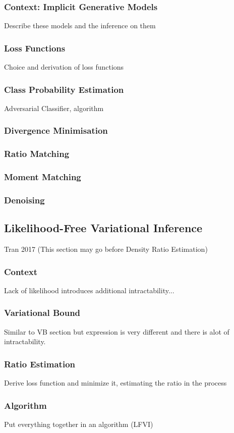 \documentclass[a4paper,12pt]{article}
\begin{document}
\subsubsection{Context: Implicit Generative Models}
Describe these models and the inference on them
\subsubsection{Loss Functions}
Choice and derivation of loss functions
\subsubsection{Class Probability Estimation}
Adversarial Classifier, algorithm
\subsubsection{Divergence Minimisation}

\subsubsection{Ratio Matching}

\subsubsection{Moment Matching}

\subsubsection{Denoising}

\newpage
\subsection{Likelihood-Free Variational Inference}
Tran 2017 (This section may go before Density Ratio Estimation)
\subsubsection{Context}
Lack of likelihood introduces additional intractability...
\subsubsection{Variational Bound}
Similar to VB section but expression is very different and there is alot of intractability.
\subsubsection{Ratio Estimation}
Derive loss function and minimize it, estimating the ratio in the process
\subsubsection{Algorithm}
Put everything together in an algorithm (LFVI)
\end{document}
